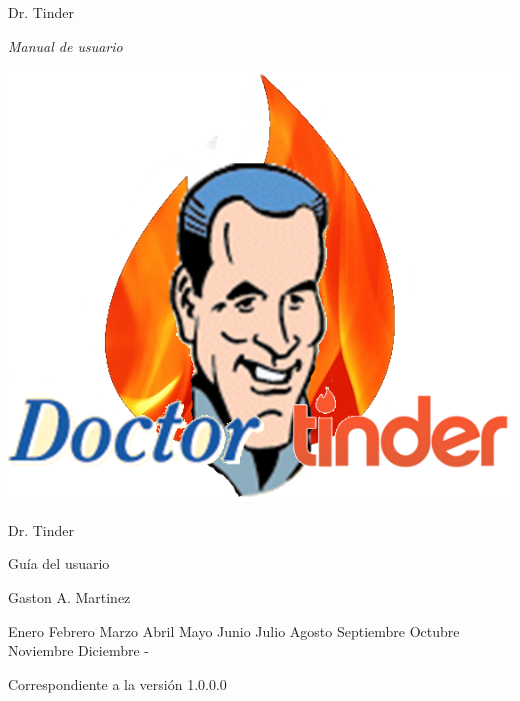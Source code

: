 \documentclass[10pt,letterpaper,extrafontsizes]{memoir}
\newcommand{\MONTH}{%
  \ifcase\the\month
  \or Enero %
  \or Febrero %
  \or Marzo %
  \or Abril %
  \or Mayo %
  \or Junio %
  \or Julio %
  \or Agosto %
  \or Septiembre %
  \or Octubre %
  \or Noviembre %
  \or Diciembre %
  \fi}
\begin{document}
\tightlists
\midsloppy
\raggedbottom



\frontmatter
\pagestyle{empty}


\vspace*{\fill}
\begin{adjustwidth}{1in}{1in}
\begin{flushleft}
\HUGE\sffamily
\end{flushleft}
\begin{center}
\HUGE\sffamily  Dr. Tinder
\end{center}
\begin{flushright}
\LARGE \ttfamily  \textit{Manual de usuario}\\
\end{flushright}
\end{adjustwidth}
\begin{flushright}
\includegraphics[width=.8\textwidth]{graficos/imagenes/logo}
\end{flushright}
\vspace*{\fill}
\cleardoublepage

\vspace*{\fill}
\begin{center}
\HUGE\textsf{Dr. Tinder}\par
\end{center}
\begin{center}
\HUGE\textsf{Guía del usuario}\par
\end{center}

\begin{center}
\Huge\textsf{ }\par
\end{center}
\begin{center}
\LARGE\textsf{Gaston A. Martinez}\par
\bigskip
\normalsize\textsf{ \MONTH - \the \year }\par
\normalsize\textsf{Correspondiente a la versión 1.0.0.0}\par
\medskip
\end{center}
\vspace*{\fill}
\clearpage
\end{document}
